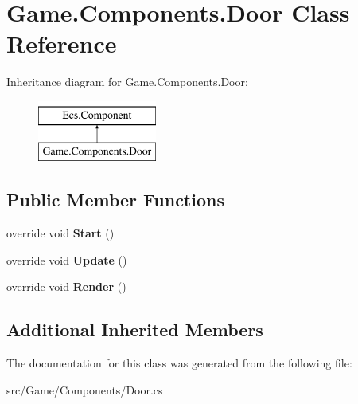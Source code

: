 \hypertarget{class_game_1_1_components_1_1_door}{}\section{Game.\+Components.\+Door Class Reference}
\label{class_game_1_1_components_1_1_door}
Inheritance diagram for Game.\+Components.\+Door\+:\begin{figure}[H]
\begin{center}
\leavevmode
\includegraphics[height=2.000000cm]{class_game_1_1_components_1_1_door}
\end{center}
\end{figure}
\subsection*{Public Member Functions}
\begin{DoxyCompactItemize}
\item 
\mbox{\label{class_game_1_1_components_1_1_door_ac04bdfb1dadbe9592cb13e0e88de63e1}} 
override void {\bfseries Start} ()
\item 
\mbox{\label{class_game_1_1_components_1_1_door_a0c075c913385dd33fe981f47caa94de7}} 
override void {\bfseries Update} ()
\item 
\mbox{\label{class_game_1_1_components_1_1_door_a50acad4b65a94f7544b383d6c8b0fed7}} 
override void {\bfseries Render} ()
\end{DoxyCompactItemize}
\subsection*{Additional Inherited Members}


The documentation for this class was generated from the following file\+:\begin{DoxyCompactItemize}
\item 
src/\+Game/\+Components/Door.\+cs\end{DoxyCompactItemize}
